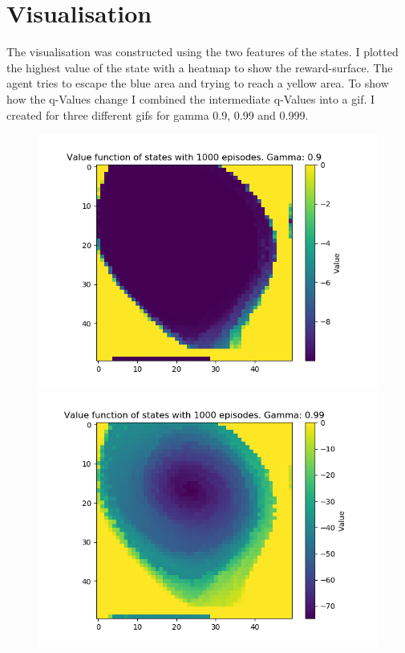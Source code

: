 \documentclass[a4paper]{article}
\begin{document}
\section{Visualisation}
The visualisation was constructed using the two features of the states. I plotted the highest value of the state with a heatmap to show the reward-surface. The agent tries to escape the blue area and trying to reach a yellow area. To show how the q-Values change I combined the intermediate q-Values into a gif. I created for three different gifs for gamma 0.9, 0.99 and 0.999.


\begin{figure}
  \includegraphics[width=\linewidth]{"gamma 09"}
\endminipage\hfill
{}
  \includegraphics[width=\linewidth]{"gamma 099"}
\endminipage\hfill
\end{figure}
\end{document}
